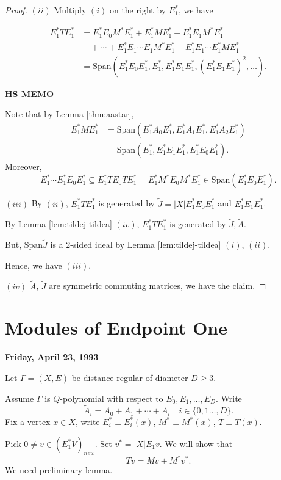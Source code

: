 \documentclass[
]{book}
\theoremstyle{definition}
\theoremstyle{definition}
\theoremstyle{definition}
\theoremstyle{definition}
\theoremstyle{remark}
\begin{document}
\begin{proof}
\((ii)\) Multiply \((i)\) on the right by \(E^*_1\), we have

\begin{align}
E^*_1TE^*_1 & = E^*_1E_0M^*E^*_1 + E^*_1ME^*_1 + E^*_1E_1M^*E^*_1\\
& \quad + \cdots + E^*_1E_1\cdots E_1M^*E^*_1 + E^*_1E_1\cdots E^*_1ME^*_1\\
& = \mathrm{Span}(E^*_1E_0E^*_1, E^*_1, E^*_1E_1E^*_1, (E^*_1E_1E^*_1)^2, \ldots).
\end{align}

\textbf{HS MEMO}

Note that by Lemma \ref{thm:aastar},
\begin{align}
E^*_1ME^*_1 & = \mathrm{Span}(E^*_1A_0E^*_1, E^*_1A_1E^*_1, E^*_1A_2E^*_1)\\
& = \mathrm{Span}(E^*_1, E^*_1E_1E^*_1, E^*_1E_0E^*_1).
\end{align}
Moreover,
\[E^*_1\cdots E^*_1E_0E^*_1 \subseteq E^*_1TE_0TE^*_1 = E^*_1M^*E_0M^*E^*_1 \in \mathrm{Span}(E^*_1E_0E^*_1).\]

\((iii)\) By \((ii)\), \(E^*_1TE^*_1\) is generated by \(\tilde{J} = |X|E^*_1E_0E^*_1\) and \(E^*_1E_1E^*_1\).

By Lemma \ref{lem:tildej-tildea} \((iv)\), \(E^*_1TE^*_1\) is generated by \(\tilde{J}, \tilde{A}\).

But, \(\mathrm{Span}{\tilde{J}}\) is a \(2\)-sided ideal by Lemma \ref{lem:tildej-tildea} \((i)\), \((ii)\).

Hence, we have \((iii)\).

\((iv)\) \(\tilde{A}\), \(\tilde{J}\) are symmetric commuting matrices, we have the claim.

\end{proof}

\hypertarget{lec34}{%
\chapter{Modules of Endpoint One}\label{lec34}}

\textbf{Friday, April 23, 1993}

Let \(\Gamma = (X,E)\) be distance-regular of diameter \(D\geq 3\).

Assume \(\Gamma\) is \(Q\)-polynomial with respect to \(E_0, E_1, \ldots, E_D\). Write
\[\tilde{A}_i = A_0 + A_1 + \cdots + A_i \quad i\in \{0, 1\ldots, D\}.\]
Fix a vertex \(x\in X\), write \(E^*_i \equiv E^*_i(x)\), \(M^* \equiv M^*(x)\), \(T\equiv T(x)\).

Pick \(0\neq v\in (E^*_1V)_{new}\). Set \(v^* = |X|E_1v\). We will show that
\[Tv = Mv + M^*v^*.\]
We need preliminary lemma.
\end{document}
